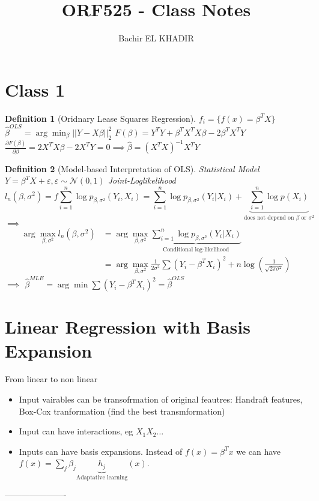 \documentclass{article}
\title{ORF525 - Class Notes}
\author{Bachir EL KHADIR }
\newtheorem{definition}{Definition}
\newenvironment{class}[1]
{\section*{Class #1}}
{ ----------------------}
\begin{document}
\maketitle

\begin{class}{1}
\begin{definition}[Oridnary Lease Squares Regression]
$f_i = \{ f(x) = \beta^T X\}$
$\hat \beta^{OLS} = \arg \min_{\beta} ||Y - X \beta||_2^2$
$F(\beta) = Y^TY + \beta^TX^TX\beta - 2\beta^TX^TY$
$\frac{\partial F(\beta)}{\partial \beta} = 2X^TX\beta - 2X^TY = 0 \implies \hat \beta = (X^TX)^{-1}X^TY$
\end{definition}
\begin{definition}[Model-based Interpretation of OLS]
  Statistical Model $Y = \beta^TX + \varepsilon, \varepsilon \sim \mathcal N(0, 1)$
  Joint-Loglikelihood
  $$l_n(\beta, \sigma^2) =f \sum_{i=1}^n \log p_{\beta, \sigma^2}(Y_i, X_i) =  \sum_{i=1}^n \log p_{\beta, \sigma^2}(Y_i| X_i) + \underbrace{ \sum_{i=1}^n \log p(X_i) }_{\text{does not depend on $\beta$ or $\sigma^2$}}  $$
  $\implies$
  \begin{align*}
    \arg\max_{\beta, \sigma^2} l_n(\beta, \sigma^2)
    &= \arg\max_{\beta, \sigma^2}  \underbrace{\sum_{i=1}^n \log p_{\beta, \sigma^2}(Y_i| X_i)}_{\text{Conditional log-likelihood}}
    \\& = \arg\max_{\beta, \sigma^2} \frac1{2\sigma^2} \sum (Y_i - \beta^TX_i)^2 + n \log(\frac1{\sqrt{2\pi\sigma^2}})
  \end{align*}
  $\implies$
  $\hat \beta^{MLE} = \arg\min \sum (Y_i - \beta^T X_i)^2 = \hat \beta^{OLS}$
\end{definition}

\section{Linear Regression with Basis Expansion}
From linear to non linear
\begin{itemize}
\item Input vairables can be transofrmation of original feautres: Handraft features, Box-Cox tranformation (find the best transmformation)
\item Input can have interactions, eg $X_1X_2 \ldots$
\item Inputs can have basis expansions. Instead of $f(x) = \beta^Tx$ we can have $f(x) = \sum_j \beta_j \underbrace{h_j}_{\text{Adaptative learning}}(x)$.
\end{itemize}


\end{class}
\end{document}
